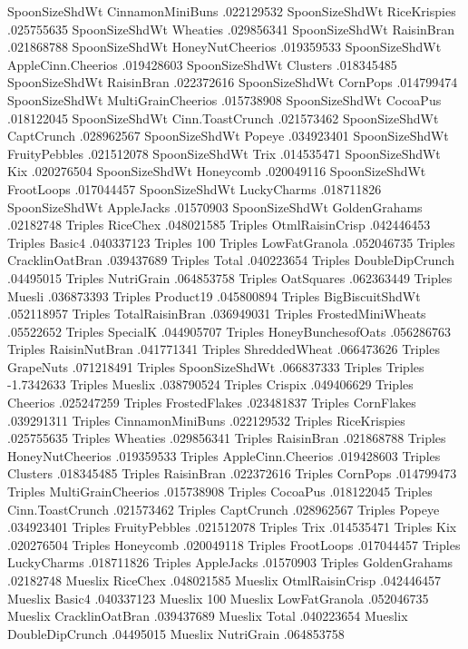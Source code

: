 SpoonSizeShdWt	CinnamonMiniBuns	.022129532
SpoonSizeShdWt	RiceKrispies	.025755635
SpoonSizeShdWt	Wheaties	.029856341
SpoonSizeShdWt	RaisinBran	.021868788
SpoonSizeShdWt	HoneyNutCheerios	.019359533
SpoonSizeShdWt	AppleCinn.Cheerios	.019428603
SpoonSizeShdWt	Clusters	.018345485
SpoonSizeShdWt	RaisinBran	.022372616
SpoonSizeShdWt	CornPops	.014799474
SpoonSizeShdWt	MultiGrainCheerios	.015738908
SpoonSizeShdWt	CocoaPus	.018122045
SpoonSizeShdWt	Cinn.ToastCrunch	.021573462
SpoonSizeShdWt	CaptCrunch	.028962567
SpoonSizeShdWt	Popeye	.034923401
SpoonSizeShdWt	FruityPebbles	.021512078
SpoonSizeShdWt	Trix	.014535471
SpoonSizeShdWt	Kix	.020276504
SpoonSizeShdWt	Honeycomb	.020049116
SpoonSizeShdWt	FrootLoops	.017044457
SpoonSizeShdWt	LuckyCharms	.018711826
SpoonSizeShdWt	AppleJacks	.01570903
SpoonSizeShdWt	GoldenGrahams	.02182748
Triples	RiceChex	.048021585
Triples	OtmlRaisinCrisp	.042446453
Triples	Basic4	.040337123
Triples	100%
Triples	LowFatGranola	.052046735
Triples	CracklinOatBran	.039437689
Triples	Total	.040223654
Triples	DoubleDipCrunch	.04495015
Triples	NutriGrain	.064853758
Triples	OatSquares	.062363449
Triples	Muesli	.036873393
Triples	Product19	.045800894
Triples	BigBiscuitShdWt	.052118957
Triples	TotalRaisinBran	.036949031
Triples	FrostedMiniWheats	.05522652
Triples	SpecialK	.044905707
Triples	HoneyBunchesofOats	.056286763
Triples	RaisinNutBran	.041771341
Triples	ShreddedWheat	.066473626
Triples	GrapeNuts	.071218491
Triples	SpoonSizeShdWt	.066837333
Triples	Triples	-1.7342633
Triples	Mueslix	.038790524
Triples	Crispix	.049406629
Triples	Cheerios	.025247259
Triples	FrostedFlakes	.023481837
Triples	CornFlakes	.039291311
Triples	CinnamonMiniBuns	.022129532
Triples	RiceKrispies	.025755635
Triples	Wheaties	.029856341
Triples	RaisinBran	.021868788
Triples	HoneyNutCheerios	.019359533
Triples	AppleCinn.Cheerios	.019428603
Triples	Clusters	.018345485
Triples	RaisinBran	.022372616
Triples	CornPops	.014799473
Triples	MultiGrainCheerios	.015738908
Triples	CocoaPus	.018122045
Triples	Cinn.ToastCrunch	.021573462
Triples	CaptCrunch	.028962567
Triples	Popeye	.034923401
Triples	FruityPebbles	.021512078
Triples	Trix	.014535471
Triples	Kix	.020276504
Triples	Honeycomb	.020049118
Triples	FrootLoops	.017044457
Triples	LuckyCharms	.018711826
Triples	AppleJacks	.01570903
Triples	GoldenGrahams	.02182748
Mueslix	RiceChex	.048021585
Mueslix	OtmlRaisinCrisp	.042446457
Mueslix	Basic4	.040337123
Mueslix	100%
Mueslix	LowFatGranola	.052046735
Mueslix	CracklinOatBran	.039437689
Mueslix	Total	.040223654
Mueslix	DoubleDipCrunch	.04495015
Mueslix	NutriGrain	.064853758
